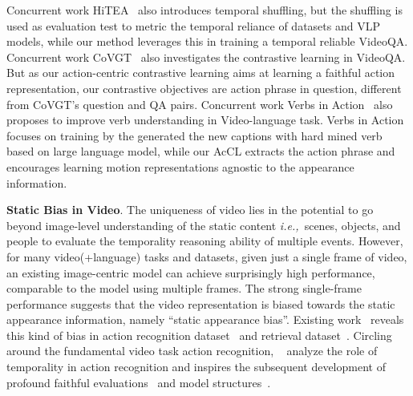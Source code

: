 \documentclass[sigconf]{acmart}
\newcommand{\ie}{\emph{i.e.,~}}
\begin{document}
Concurrent work HiTEA~\cite{ye2022hitea} also introduces temporal shuffling, but the shuffling is used as evaluation test to metric the temporal reliance of datasets and VLP models, while our method leverages this in training a temporal reliable VideoQA. Concurrent work CoVGT~\cite{xiao2023contrastive} also investigates the contrastive learning in VideoQA. But as our action-centric contrastive learning aims at learning a faithful action representation, our contrastive objectives are action phrase in question, different from CoVGT’s question and QA pairs. 
Concurrent work Verbs in Action~\cite{momeni2023verbs} also proposes to improve verb understanding in Video-language task. Verbs in Action focuses on training by the generated the new captions with hard mined verb based on large language model, while our AcCL extracts the action phrase and encourages learning motion representations agnostic to the appearance information.

 









\textbf{Static Bias in Video}. 
The uniqueness of video lies in the potential to go beyond image-level understanding of the static content \ie scenes, objects, and people to evaluate the temporality reasoning ability of multiple events.
However, for many video(+language) tasks and datasets, given just a single frame of video, an existing image-centric model can achieve surprisingly high performance, comparable to the model using multiple frames. The strong single-frame performance suggests that the video representation is biased towards the static appearance information, namely ``static appearance bias''. 
Existing work~\cite{buch2022revisiting, lei2022revealing,li2018resound,choi2019can} reveals this kind of bias in action recognition dataset~\cite{carreira2017quo,soomro2012ucf101} and retrieval dataset~\cite{liu2019use,luo2021clip4clip}. 
Circling around the fundamental video task action recognition, ~\cite{li2018resound,choi2019can} analyze the role of temporality in action recognition and inspires the subsequent development of profound faithful evaluations~\cite{shao2020finegym,li2018resound} and model structures~\cite{feichtenhofer2019slowfast,lin2019tsm,feichtenhofer2020x3d,duan2022revisiting}. 
\end{document}
